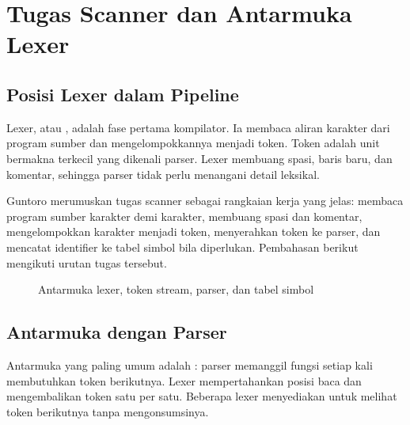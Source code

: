 \section{Tugas Scanner dan Antarmuka Lexer}
\label{sec:ch05-peran}

\subsection{Posisi Lexer dalam Pipeline}

Lexer, atau , adalah fase pertama kompilator. Ia membaca
aliran karakter dari program sumber dan mengelompokkannya menjadi
token. Token adalah unit bermakna terkecil yang dikenali parser.
Lexer membuang spasi, baris baru, dan komentar, sehingga parser tidak
perlu menangani detail leksikal.

Guntoro merumuskan tugas scanner sebagai rangkaian kerja yang jelas:
membaca program sumber karakter demi karakter, membuang spasi dan
komentar, mengelompokkan karakter menjadi token, menyerahkan token
ke parser, dan mencatat identifier ke tabel simbol bila diperlukan.
Pembahasan berikut mengikuti urutan tugas tersebut.

\begin{figure}[H]
\centering
{}
\caption{Antarmuka lexer, token stream, parser, dan tabel simbol}
\label{fig:ch05-antarmuka}
\end{figure}

\subsection{Antarmuka dengan Parser}

Antarmuka yang paling umum adalah : parser memanggil
fungsi  setiap kali membutuhkan token berikutnya.
Lexer mempertahankan posisi baca dan mengembalikan token satu per
satu. Beberapa lexer menyediakan  untuk melihat token
berikutnya tanpa mengonsumsinya.

